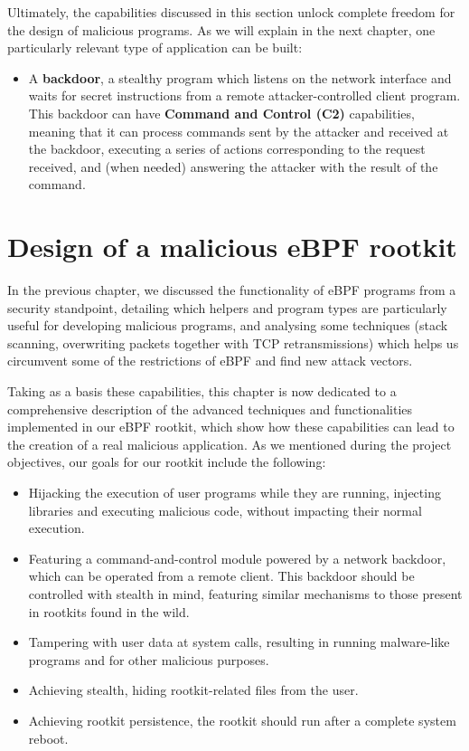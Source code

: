\documentclass[12pt]{report} %
\begin{document}
Ultimately, the capabilities discussed in this section unlock complete freedom for the design of malicious programs. As we will explain in the next chapter, one particularly relevant type of application can be built:
\begin{itemize}
\item A \textbf{backdoor}, a stealthy program which listens on the network interface and waits for secret instructions from a remote attacker-controlled client program. This backdoor can have \textbf{Command and Control (C2)} capabilities, meaning that it can process commands sent by the attacker and received at the backdoor, executing a series of actions corresponding to the request received, and (when needed) answering the attacker with the result of the command.
\end{itemize}



\chapter{Design of a malicious eBPF rootkit}
In the previous chapter, we discussed the functionality of eBPF programs from a security standpoint, detailing which helpers and program types are particularly useful for developing malicious programs, and analysing some techniques (stack scanning, overwriting packets together with TCP retransmissions) which helps us circumvent some of the restrictions of eBPF and find new attack vectors.

Taking as a basis these capabilities, this chapter is now dedicated to a comprehensive description of the advanced techniques and functionalities implemented in our eBPF rootkit, which show how these capabilities can lead to the creation of a real malicious application. As we mentioned during the project objectives, our goals for our rootkit include the following:
\begin{itemize}
\item Hijacking the execution of user programs while they are running, injecting libraries and executing malicious code, without impacting their normal execution.
\item Featuring a command-and-control module powered by a network backdoor, which can be operated from a remote client. This backdoor should be controlled with stealth in mind, featuring similar mechanisms to those present in rootkits found in the wild.
\item Tampering with user data at system calls, resulting in running malware-like programs and for other malicious purposes.
\item Achieving stealth, hiding rootkit-related files from the user.
\item Achieving rootkit persistence, the rootkit should run after a complete system reboot.
\
\end{itemize}
\end{document}
